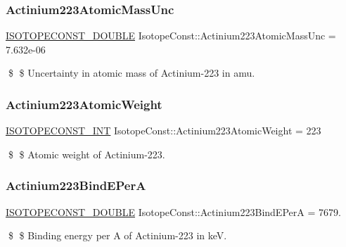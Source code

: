 \subsubsection{\texorpdfstring{Actinium223\+Atomic\+Mass\+Unc}{Actinium223AtomicMassUnc}}
{\footnotesize\ttfamily \mbox{\hyperlink{group___isotope_const-_macros_ga8f45a7272ce02c0b4c65c44636ed719a}{I\+S\+O\+T\+O\+P\+E\+C\+O\+N\+S\+T\+\_\+\+D\+O\+U\+B\+LE}} Isotope\+Const\+::\+Actinium223\+Atomic\+Mass\+Unc = 7.\+632e-\/06}

\$ \$ Uncertainty in atomic mass of Actinium-\/223 in amu. \mbox{\label{group___isotope_const-_actinium-_ac223_ga47d1d81bb29919d2b04632c4ff8f46aa}} 
\subsubsection{\texorpdfstring{Actinium223\+Atomic\+Weight}{Actinium223AtomicWeight}}
{\footnotesize\ttfamily \mbox{\hyperlink{group___isotope_const-_macros_ga5f18360b3e99483a35c32d789e62621c}{I\+S\+O\+T\+O\+P\+E\+C\+O\+N\+S\+T\+\_\+\+I\+NT}} Isotope\+Const\+::\+Actinium223\+Atomic\+Weight = 223}

\$ \$ Atomic weight of Actinium-\/223. \mbox{\label{group___isotope_const-_actinium-_ac223_ga324bafb4242da5a795abe27a9f7b0014}} 
\subsubsection{\texorpdfstring{Actinium223\+Bind\+E\+PerA}{Actinium223BindEPerA}}
{\footnotesize\ttfamily \mbox{\hyperlink{group___isotope_const-_macros_ga8f45a7272ce02c0b4c65c44636ed719a}{I\+S\+O\+T\+O\+P\+E\+C\+O\+N\+S\+T\+\_\+\+D\+O\+U\+B\+LE}} Isotope\+Const\+::\+Actinium223\+Bind\+E\+PerA = 7679.}

\$ \$ Binding energy per A of Actinium-\/223 in keV. \mbox{\label{group___isotope_const-_actinium-_ac223_gae9ffd86f5f950506de79a8c40794a5a3}} 
